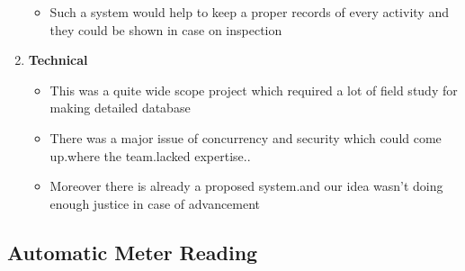 \documentclass[fleqn,10pt]{../SelfArx} %
\begin{document}
\begin{enumerate}
\begin{itemize}
\item Such a system would help to keep a proper records of every activity and they could be shown in case on inspection
\end{itemize}

\item \textbf{Technical}
\begin{itemize}

\item
This was a quite wide scope project which required a lot of field study for making detailed database
\item
There was a major issue of concurrency and security which could come up.where the team.lacked expertise..
\item
Moreover there is already a proposed system.and our idea wasn't doing enough justice in case of advancement
\end{itemize}
\end{enumerate}

\subsection{Automatic Meter Reading}
\end{document}
